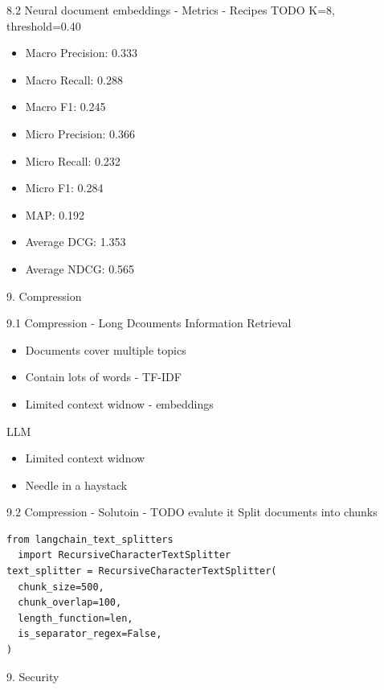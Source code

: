 \documentclass{beamer}
\begin{document}
\begin{frame}{8.2 Neural document embeddings - Metrics - Recipes}
  TODO
  K=8, threshold=0.40
  \begin{itemize}
    \item Macro Precision: 0.333
    \item Macro Recall: 0.288
    \item Macro F1: 0.245
    \item Micro Precision: 0.366
    \item Micro Recall: 0.232
    \item Micro F1: 0.284
    \item MAP: 0.192
    \item Average DCG: 1.353
    \item Average NDCG: 0.565
  \end{itemize}
\end{frame}

\begin{frame}{9. Compression}
\end{frame}

\begin{frame}{9.1 Compression - Long Dcouments}
  Information Retrieval
  \begin{itemize}
    \item Documents cover multiple topics
    \item Contain lots of words - TF-IDF
    \item Limited context widnow - embeddings
  \end{itemize}
  LLM
  \begin{itemize}
    \item Limited context widnow
    \item Needle in a haystack
  \end{itemize}
\end{frame}

\begin{frame}[fragile]{9.2 Compression - Solutoin - TODO evalute it}
  Split documents into chunks
  \begin{verbatim}
from langchain_text_splitters
  import RecursiveCharacterTextSplitter
text_splitter = RecursiveCharacterTextSplitter(
  chunk_size=500,
  chunk_overlap=100,
  length_function=len,
  is_separator_regex=False,
)
\end{verbatim}
\end{frame}

\begin{frame}{9. Security}
\end{frame}
\end{document}

